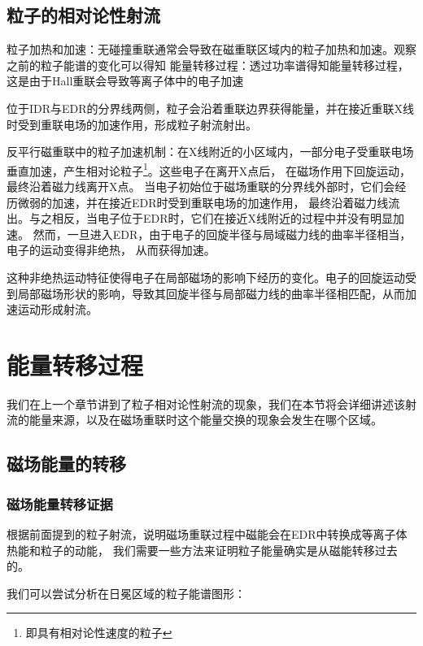 \subsection[\textnormal{粒子的相对论性射流}]{\textbf{粒子的相对论性射流}}

粒子加热和加速：无碰撞重联通常会导致在磁重联区域内的粒子加热和加速。观察之前的粒子能谱的变化可以得知
能量转移过程：透过功率谱得知能量转移过程\cite{Yi_2018, PhysRevLett.116.095003}，这是由于Hall重联会导致等离子体中的电子加速

位于IDR与EDR的分界线两侧，粒子会沿着重联边界获得能量，并在接近重联X线时受到重联电场的加速作用，形成粒子射流射出。

反平行磁重联中的粒子加速机制：在X线附近的小区域内，一部分电子受重联电场垂直加速，产生相对论粒子\footnote{即具有相对论性速度的粒子}。这些电子在离开X点后，
在磁场作用下回旋运动，最终沿着磁力线离开X点。
当电子初始位于磁场重联的分界线外部时，它们会经历微弱的加速，并在接近EDR时受到重联电场的加速作用，
最终沿着磁力线流出。与之相反，当电子位于EDR时，它们在接近X线附近的过程中并没有明显加速。
然而，一旦进入EDR，由于电子的回旋半径与局域磁力线的曲率半径相当，电子的运动变得非绝热，
从而获得加速。

这种非绝热运动特征使得电子在局部磁场的影响下经历的变化。电子的回旋运动受到局部磁场形状的影响，导致其回旋半径与局部磁力线的曲率半径相匹配，从而加速运动形成射流。

\section[\textnormal{能量转移过程}]{\textbf{能量转移过程}}

我们在上一个章节讲到了粒子相对论性射流的现象，我们在本节将会详细讲述该射流的能量来源，以及在磁场重联时这个能量交换的现象会发生在哪个区域。
\subsection[\textnormal{磁场能量的转移}]{\textbf{磁场能量的转移}}

\subsubsection*{\textbf{磁场能量转移证据}}

根据前面提到的粒子射流，说明磁场重联过程中磁能会在EDR中转换成等离子体热能和粒子的动能，
我们需要一些方法来证明粒子能量确实是从磁能转移过去的。

我们可以尝试分析在日冕区域的粒子能谱图形：

